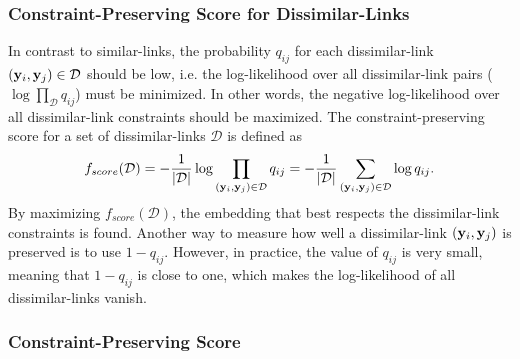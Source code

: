 \subsubsection*{Constraint-Preserving Score for Dissimilar-Links}
In contrast to similar-links, the probability $q_{ij}$ for each dissimilar-link $({\bf y}_i, {\bf y}_j) \in \mathcal{D}$ should be low, i.e. the log-likelihood over all dissimilar-link pairs ($\log \prod_{\mathcal{D}} q_{ij}$) must be minimized. In other words, the negative log-likelihood over all dissimilar-link constraints should be maximized. The constraint-preserving score for a set of dissimilar-links $\mathcal{D}$ is defined as
\begin{equation}
f_{score}(\mathcal{D}) = -\frac{1}{|\mathcal{D}|} \log \prod_{({\bf y}_i, {\bf y}_j) \in \mathcal{D}} q_{ij}
                = -\frac{1}{|\mathcal{D}|} \sum_{({\bf y}_i, {\bf y}_j) \in \mathcal{D}} \log q_{ij}.
\end{equation}
By maximizing $f_{score}(\mathcal{D})$, the embedding that best respects the dissimilar-link constraints is found.
Another way to measure how well a dissimilar-link $({\bf y}_i, {\bf y}_j)$ is preserved is to use $1 - q_{ij}$. However, in practice, the value of $q_{ij}$ is very small, meaning that $1 - q_{ij}$ is close to one, which makes the log-likelihood of all dissimilar-links vanish.

\subsubsection*{Constraint-Preserving Score}


